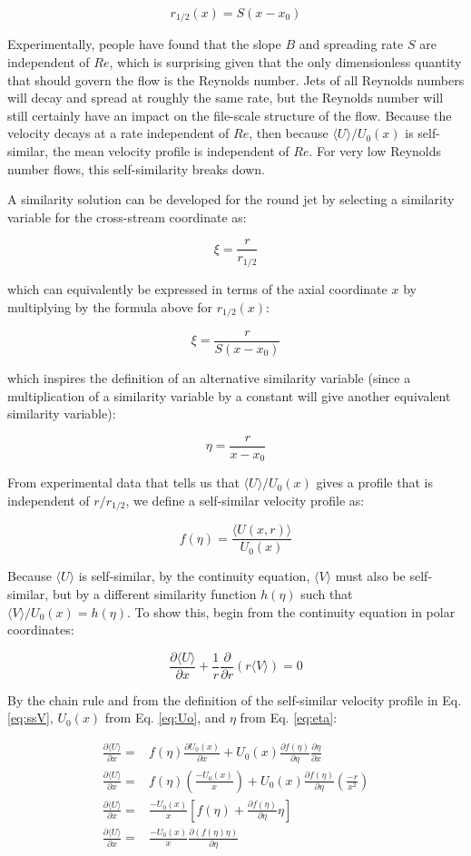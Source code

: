 \documentclass[10pt]{article}
\newcommand{\beq}{\begin{equation}}
\newcommand{\eeq}{\end{equation}}
\newcommand{\beqa}{\begin{equation}\begin{aligned}}
\newcommand{\eeqa}{\end{aligned}\end{equation}}
\newcommand{\la}{\langle}
\newcommand{\ra}{\rangle}
\begin{document}
\begin{flushleft}
\beq
r_{1/2}(x)=S(x-x_0)
\eeq

Experimentally, people have found that the slope \(B\) and spreading rate \(S\) are independent of \(Re\), which is surprising given that the only dimensionless quantity that should govern the flow is the Reynolds number. Jets of all Reynolds numbers will decay and spread at roughly the same rate, but the Reynolds number will still certainly have an impact on the file-scale structure of the flow. Because the velocity decays at a rate independent of \(Re\), then because \(\la U\ra/U_0(x)\) is self-similar, the mean velocity profile is independent of \(Re\). For very low Reynolds number flows, this self-similarity breaks down. 

A similarity solution can be developed for the round jet by selecting a similarity variable for the cross-stream coordinate as:

\beq
\xi=\frac{r}{r_{1/2}}
\eeq

which can equivalently be expressed in terms of the axial coordinate \(x\) by multiplying by the formula above for \(r_{1/2}(x)\):

\beq
\xi=\frac{r}{S(x-x_0)}
\eeq

which inspires the definition of an alternative similarity variable (since a multiplication of a similarity variable by a constant will give another equivalent similarity variable):

\beq
\label{eq:eta}
\eta=\frac{r}{x-x_0}
\eeq

From experimental data that tells us that \(\la U\ra/U_0(x)\) gives a profile that is independent of \(r/r_{1/2}\), we define a self-similar velocity profile as:

\beq
\label{eq:ssV}
f(\eta)=\frac{\la U(x,r)\ra}{U_0(x)}
\eeq

Because \(\la U\ra\) is self-similar, by the continuity equation, \(\la V\ra\) must also be self-similar, but by a different similarity function \(h(\eta)\) such that \(\la V\ra/U_0(x)=h(\eta)\). To show this, begin from the continuity equation in polar coordinates:

\beq
\frac{\partial\la U\ra}{\partial x}+\frac{1}{r}\frac{\partial}{\partial r}(r\la V\ra)=0
\eeq

By the chain rule and from the definition of the self-similar velocity profile in Eq. \eqref{eq:ssV}, \(U_0(x)\) from Eq. \eqref{eq:Uo}, and \(\eta\) from Eq. \eqref{eq:eta}:

\beqa
\frac{\partial\la U\ra}{\partial x}=&f(\eta)\frac{\partial U_0(x)}{\partial x}+U_0(x)\frac{\partial f(\eta)}{\partial\eta}\frac{\partial\eta}{\partial x}\\
\frac{\partial\la U\ra}{\partial x}=&f(\eta)\left(\frac{-U_0(x)}{x}\right)+U_0(x)\frac{\partial f(\eta)}{\partial\eta}\left(\frac{-r}{x^2}\right)\\
\frac{\partial\la U\ra}{\partial x}=&\frac{-U_0(x)}{x}\left\lbrack f(\eta)+\frac{\partial f(\eta)}{\partial\eta}\eta\right\rbrack\\
\frac{\partial\la U\ra}{\partial x}=&\frac{-U_0(x)}{x}\frac{\partial (f(\eta)\eta)}{\partial\eta}\\
\eeqa


\end{flushleft}
\end{document}
